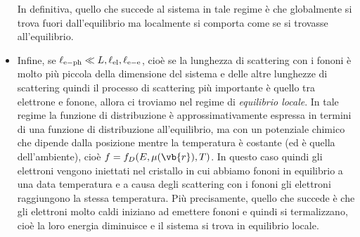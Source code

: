 \begin{itemize}[leftmargin=0.5cm]
    In definitiva, quello che succede al sistema in tale regime è che globalmente si trova fuori dall'equilibrio ma localmente si comporta come se si trovasse all'equilibrio.
    \item Infine, se $\ell_{\rm e-ph} \ll L, \ell_{\rm el}, \ell_{\rm e-e}$, cioè se la lunghezza di scattering con i fononi è molto più piccola della dimensione del sistema e delle altre lunghezze di scattering quindi il processo di scattering più importante è quello tra elettrone e fonone, allora ci troviamo nel regime di \textit{equilibrio locale}. In tale regime la funzione di distribuzione è approssimativamente espressa in termini di una funzione di distribuzione all'equilibrio, ma con un potenziale chimico che dipende dalla posizione mentre la temperatura è costante (ed è quella dell'ambiente), cioè $f=f_{D}(E,\mu(\vb{r}),T)$. In questo caso quindi gli elettroni vengono iniettati nel cristallo in cui abbiamo fononi in equilibrio a una data temperatura e a causa degli scattering con i fononi gli elettroni raggiungono la stessa temperatura. Più precisamente, quello che succede è che gli elettroni molto caldi iniziano ad emettere fononi e quindi si termalizzano, cioè la loro energia diminuisce e il sistema si trova in equilibrio locale.
\end{itemize}
